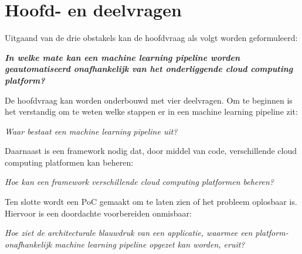 \section{Hoofd- en deelvragen}\label{sec:hoofd-en-deelvragen}
Uitgaand van de drie obstakels kan de hoofdvraag als volgt worden geformuleerd:

\begin{quoting}
  \begin{center}
    \textbf{
      \textit{
        In welke mate kan een machine learning pipeline worden geautomatiseerd onafhankelijk van het onderliggende cloud computing platform?
      }
    }
  \end{center}
\end{quoting}\smallskip

De hoofdvraag kan worden onderbouwd met vier deelvragen. Om te beginnen is het verstandig om te weten welke stappen er in een machine learning pipeline zit:

\begin{quoting}
  \begin{center}
    \textit{
      Waar bestaat een machine learning pipeline uit?
    }
  \end{center}
\end{quoting}\smallskip

Daarnaast is een framework nodig dat, door middel van code, verschillende cloud computing platformen kan beheren:

\begin{quoting}
  \begin{center}
    \textit{
      Hoe kan een framework verschillende cloud computing platformen beheren?
    }
  \end{center}
\end{quoting}\smallskip

Ten slotte wordt een PoC gemaakt om te laten zien of het probleem oplosbaar is. Hiervoor is een doordachte voorbereiden onmisbaar:

\begin{quoting}
  \begin{center}
    \textit{
      Hoe ziet de architecturale blauwdruk van een applicatie, waarmee een platform-onafhankelijk machine learning pipeline opgezet kan worden, eruit?
    }
  \end{center}
\end{quoting}





